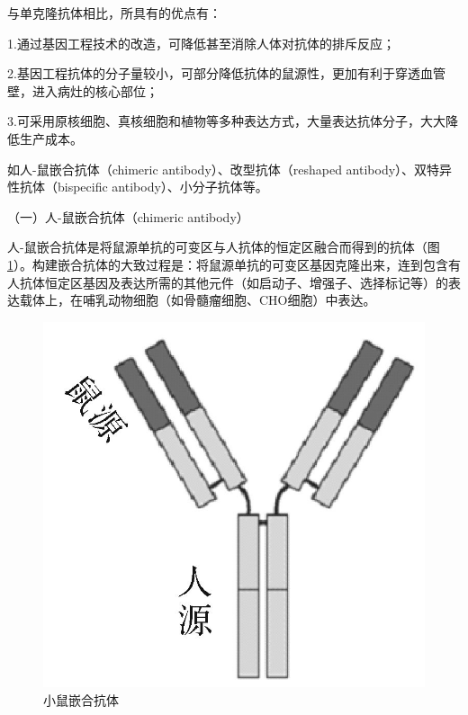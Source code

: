 与单克隆抗体相比，所具有的优点有：

1.通过基因工程技术的改造，可降低甚至消除人体对抗体的排斥反应；

2.基因工程抗体的分子量较小，可部分降低抗体的鼠源性，更加有利于穿透血管壁，进入病灶的核心部位；

3.可采用原核细胞、真核细胞和植物等多种表达方式，大量表达抗体分子，大大降低生产成本。

如人-鼠嵌合抗体（chimeric antibody）、改型抗体（reshaped
antibody）、双特异性抗体（bispecific antibody）、小分子抗体等。

（一）人-鼠嵌合抗体（chimeric antibody）

人-鼠嵌合抗体是将鼠源单抗的可变区与人抗体的恒定区融合而得到的抗体（图\ref{fig4-14}）。构建嵌合抗体的大致过程是：将鼠源单抗的可变区基因克隆出来，连到包含有人抗体恒定区基因及表达所需的其他元件（如启动子、增强子、选择标记等）的表达载体上，在哺乳动物细胞（如骨髓瘤细胞、CHO细胞）中表达。

\begin{figure}[!htbp]
 \centering
 \includegraphics{./images/Image00074.jpg}
 \captionsetup{justification=centering}
 \caption{小鼠嵌合抗体}
 \label{fig4-14}
  \end{figure} 

